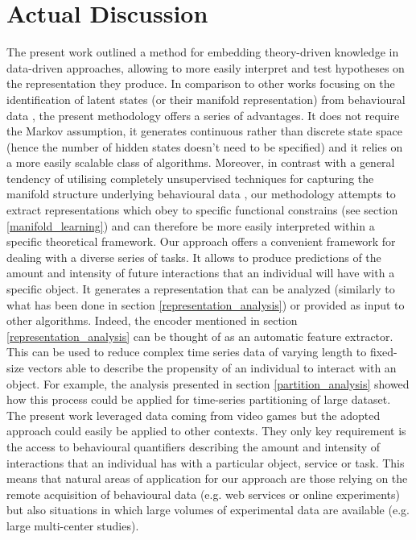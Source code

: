 \section{Actual Discussion}
The present work outlined a method for embedding theory-driven knowledge in data-driven approaches, allowing to more easily interpret and test hypotheses on the representation they produce. In comparison to other works focusing on the identification of latent states (or their manifold representation) from behavioural data \cite{calhoun2019unsupervised, luxem2020identifying, pereira2020quantifying, shi2021learning, mccullough2021unsupervised}, the present methodology offers a series of advantages. It does not require the Markov assumption, it generates continuous rather than discrete state space (hence the number of hidden states doesn't need to be specified) and it relies on a more easily scalable class of algorithms. Moreover, in contrast with a general tendency of utilising completely unsupervised techniques for capturing the manifold structure underlying behavioural data \cite{calhoun2019unsupervised, luxem2020identifying, pereira2020quantifying, shi2021learning, mccullough2021unsupervised}, our methodology attempts to extract representations which obey to specific functional constrains (see section \ref{manifold_learning}) and can therefore be more easily interpreted within a specific theoretical framework. Our approach offers a convenient framework for dealing with a diverse series of tasks. It allows to produce predictions of the amount and intensity of future interactions that an individual will have with a specific object. It generates a representation that can be analyzed (similarly to what has been done in section \ref{representation_analysis}) or provided as input to other algorithms. Indeed, the encoder mentioned in section \ref{representation_analysis} can be thought of as an automatic feature extractor. This can be used to reduce complex time series data of varying length to fixed-size vectors able to describe the propensity of an individual to interact with an object. For example, the analysis presented in section \ref{partition_analysis} showed how this process could be applied for time-series partitioning of large dataset. The present work leveraged data coming from video games but the adopted approach could easily be applied to other contexts. They only key requirement is the access to behavioural quantifiers describing the amount and intensity of interactions that an individual has with a particular object, service or task. This means that natural areas of application for our approach are those relying on the remote acquisition of behavioural data (e.g. web services or online experiments) but also situations in which large volumes of experimental data are available (e.g. large multi-center studies).  

